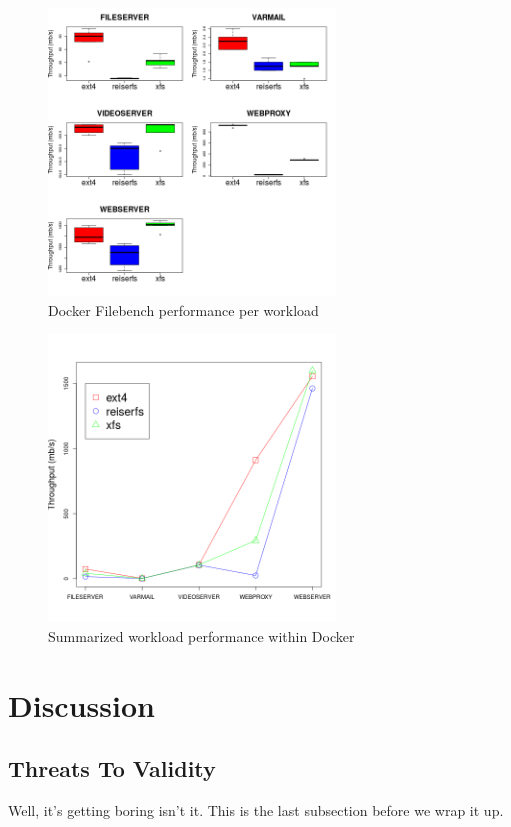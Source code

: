 \documentclass[letterpaper,twocolumn,10pt]{article}
\begin{document}
\begin{figure}[!ht]
\centering
\includegraphics[width=3in]{../results/dock_workload_boxplots.png}
\caption{Docker Filebench performance per workload}
\label{fig:dock_workload_boxplots}
\end{figure}

\begin{figure}[!ht]
\centering
\includegraphics[width=3in]{../results/dock_summarized_performance.png}
\caption{Summarized workload performance within Docker}
\label{fig:dock_summarized_performance}
\end{figure}

\section{Discussion}
\subsection{Threats To Validity}
Well, it's getting boring isn't it.  This is the last subsection
before we wrap it up.
\end{document}
